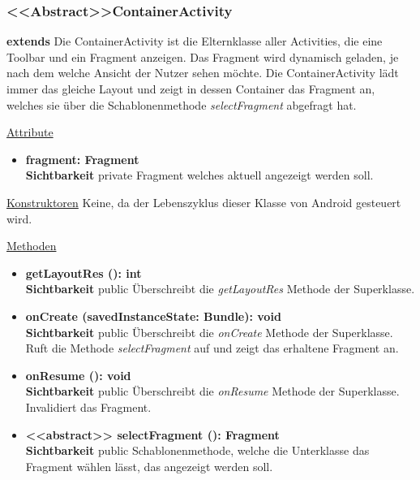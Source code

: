 \subsubsection{<<Abstract>>ContainerActivity} \label{app:klasse:ContainerActivity}
\textbf{extends}  \newline
Die ContainerActivity ist die Elternklasse aller Activities, die eine Toolbar und ein Fragment anzeigen. Das Fragment wird dynamisch geladen, je nach dem welche Ansicht der Nutzer sehen möchte. 
Die ContainerActivity lädt immer das gleiche Layout und zeigt in dessen Container das Fragment an, welches sie über die Schablonenmethode \textit{selectFragment} abgefragt hat.
\newline

\underline{Attribute}
\begin{itemize}
\itemsep0pt
\item \textbf{fragment: Fragment} \hfill\\ 
\textbf{Sichtbarkeit} private\newline
Fragment welches aktuell angezeigt werden soll.

\end{itemize}

\underline{Konstruktoren}\newline
\indent Keine, da der Lebenszyklus dieser Klasse von Android gesteuert wird.\newline

\underline{Methoden}
\begin{itemize}
\itemsep0pt

\item \textbf{getLayoutRes (): int}\hfill\\
\textbf{Sichtbarkeit} public\newline
Überschreibt die \textit{getLayoutRes} Methode der Superklasse.

\item \textbf{onCreate (savedInstanceState: Bundle): void}\hfill\\
\textbf{Sichtbarkeit} public\newline
Überschreibt die \textit{onCreate} Methode der Superklasse. Ruft die Methode \textit{selectFragment} auf und zeigt das erhaltene Fragment an.

\item \textbf{onResume (): void}\hfill\\
\textbf{Sichtbarkeit} public\newline
Überschreibt die \textit{onResume} Methode der Superklasse. Invalidiert das Fragment.

\item \textbf{<<abstract>> selectFragment (): Fragment} \hfill\\
\textbf{Sichtbarkeit} public\newline
Schablonenmethode, welche die Unterklasse das Fragment wählen lässt, das angezeigt werden soll.

\end{itemize}
